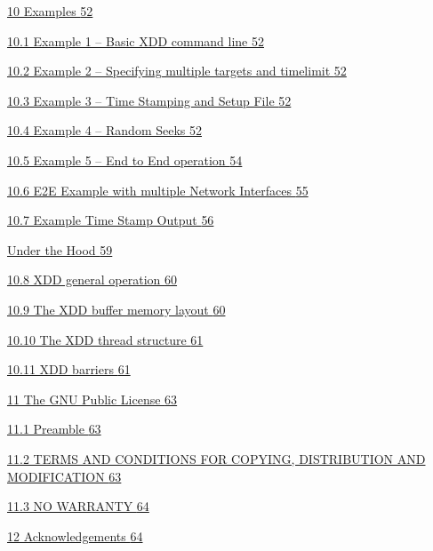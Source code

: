 \hyperref[examples]{10 Examples \hyperref[examples]{52}}

\hyperref[example-1-basic-xdd-command-line]{10.1 Example 1 -- Basic XDD command line \hyperref[example-1-basic-xdd-command-line]{52}}

\hyperref[example-2-specifying-multiple-targets-and-timelimit]{10.2 Example 2 -- Specifying multiple targets and timelimit \hyperref[example-2-specifying-multiple-targets-and-timelimit]{52}}

\hyperref[example-3-time-stamping-and-setup-file]{10.3 Example 3 -- Time Stamping and Setup File \hyperref[example-3-time-stamping-and-setup-file]{52}}

\hyperref[example-4-random-seeks]{10.4 Example 4 -- Random Seeks \hyperref[example-4-random-seeks]{52}}

\hyperref[example-5-end-to-end-operation]{10.5 Example 5 -- End to End operation \hyperref[example-5-end-to-end-operation]{54}}

\hyperref[e2e-example-with-multiple-network-interfaces]{10.6 E2E Example with multiple Network Interfaces \hyperref[e2e-example-with-multiple-network-interfaces]{55}}

\hyperref[example-time-stamp-output]{10.7 Example Time Stamp Output \hyperref[example-time-stamp-output]{56}}

\hyperref[under-the-hood]{Under the Hood \hyperref[under-the-hood]{59}}

\hyperref[xdd-general-operation]{10.8 XDD general operation \hyperref[xdd-general-operation]{60}}

\hyperref[the-xdd-buffer-memory-layout]{10.9 The XDD buffer memory layout \hyperref[the-xdd-buffer-memory-layout]{60}}

\hyperref[the-xdd-thread-structure]{10.10 The XDD thread structure \hyperref[the-xdd-thread-structure]{61}}

\hyperref[xdd-barriers]{10.11 XDD barriers \hyperref[xdd-barriers]{61}}

\hyperref[the-gnu-public-license]{11 The GNU Public License \hyperref[the-gnu-public-license]{63}}

\hyperref[_Toc290917472]{11.1 Preamble \hyperref[_Toc290917472]{63}}

\hyperref[_Toc290917473]{11.2 TERMS AND CONDITIONS FOR COPYING, DISTRIBUTION AND MODIFICATION \hyperref[_Toc290917473]{63}}

\hyperref[no-warranty]{11.3 NO WARRANTY \hyperref[no-warranty]{64}}

\hyperref[acknowledgements-1]{12 Acknowledgements \hyperref[acknowledgements-1]{64}}

\newpage
